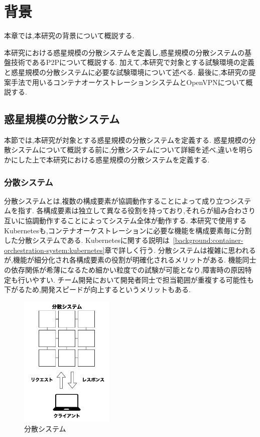 \chapter{背景}
\label{background}

本章では,本研究の背景について概説する.

本研究における惑星規模の分散システムを定義し,惑星規模の分散システムの基盤技術であるP2Pについて概説する.
加えて,本研究で対象とする試験環境の定義と惑星規模の分散システムに必要な試験環境について述べる.
最後に,本研究の提案手法で用いるコンテナオーケストレーションシステムとOpenVPNについて概説する.

\section{惑星規模の分散システム}
\label{bg:definition}

本節では,本研究が対象とする惑星規模の分散システムを定義する.
惑星規模の分散システムについて概説する前に,分散システムについて詳細を述べ,違いを明らかにした上で本研究における惑星規模の分散システムを定義する.

\subsection{分散システム}
\label{bg:definition:distributed-system}

分散システムとは,複数の構成要素が協調動作することによって成り立つシステムを指す.
各構成要素は独立して異なる役割を持っており,それらが組み合わさり互いに協調動作することによってシステム全体が動作する.
本研究で使用するKubernetesも,コンテナオーケストレーションに必要な機能を構成要素毎に分割した分散システムである.
Kubernetesに関する説明は~\ref{background:container-orchestration-system:kubernetes}章で詳しく行う.
分散システムは複雑に思われるが,機能が細分化され各構成要素の役割が明確化されるメリットがある.
機能同士の依存関係が希薄になるため細かい粒度での試験が可能となり,障害時の原因特定も行いやすい.
チーム開発において開発者同士で担当範囲が重複する可能性も下がるため,開発スピードが向上するというメリットもある.

\begin{figure}[htbp]
\begin{center}
    \includegraphics[width=0.4\textwidth]{./figures/distributed-system.jpg}
    \caption{分散システム}
\end{center}
\end{figure}

